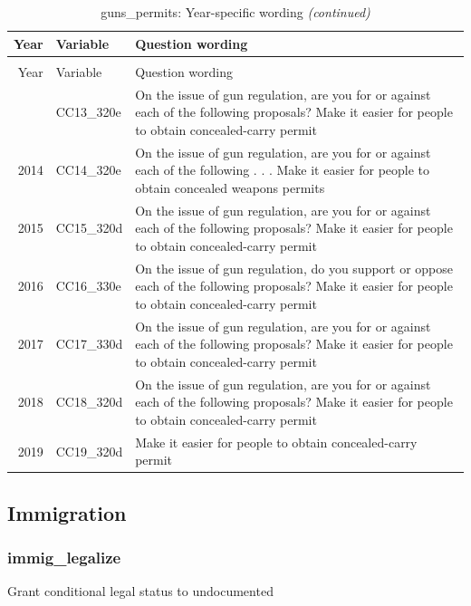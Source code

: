 \documentclass[12pt]{article}
\begin{document}
\begin{longtable}[t]{rl>{\raggedright\arraybackslash}p{10cm}}
\caption{\label{tab:unnamed-chunk-4}guns\_permits: Year-specific wording}\\
\toprule
Year & Variable & Question wording\\
\midrule
\endfirsthead
\caption[]{guns\_permits: Year-specific wording \textit{(continued)}}\\
\toprule
Year & Variable & Question wording\\
\midrule
\endhead
\
\endfoot
\bottomrule
\endlastfoot
2013 & CC13\_320e & On the issue of gun regulation, are you for or against each of the following proposals? Make it easier for people to obtain concealed-carry permit\\
2014 & CC14\_320e & On the issue of gun regulation, are you for or against each of the following . . . Make it easier for people to obtain concealed weapons permits\\
2015 & CC15\_320d & On the issue of gun regulation, are you for or against each of the following proposals? Make it easier for people to obtain concealed-carry permit\\
2016 & CC16\_330e & On the issue of gun regulation, do you support or oppose each of the following proposals? Make it easier for people to obtain concealed-carry permit\\
2017 & CC17\_330d & On the issue of gun regulation, are you for or against each of the following proposals? Make it easier for people to obtain concealed-carry permit\\
2018 & CC18\_320d & On the issue of gun regulation, are you for or against each of the following proposals? Make it easier for people to obtain concealed-carry permit\\
2019 & CC19\_320d & Make it easier for people to obtain concealed-carry permit\\*
\end{longtable}\newpage

\subsection{Immigration}\label{immigration}

\subsubsection{immig\_legalize}\label{immig_legalize}

Grant conditional legal status to undocumented
\end{document}
